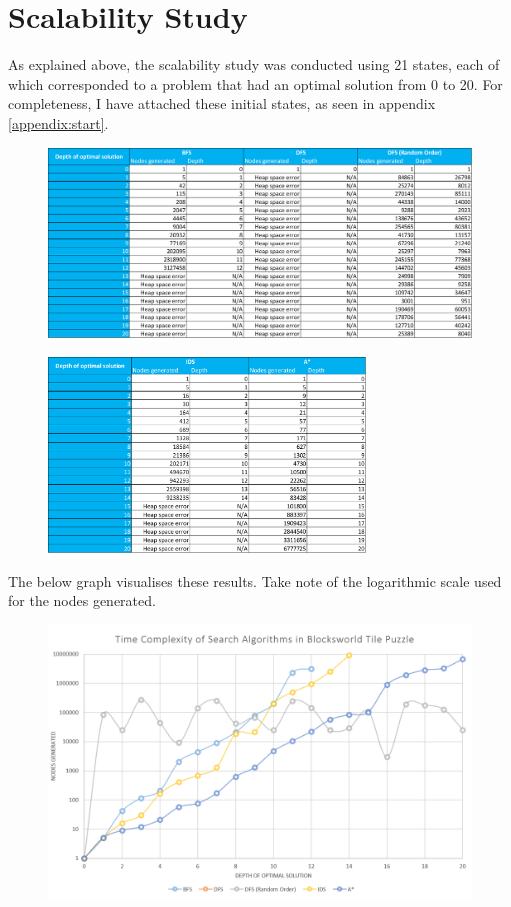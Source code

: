 \documentclass{article}
\begin{document}
	\newpage
	\section{Scalability Study}
	As explained above, the scalability study was conducted using 21 states, each of which corresponded to a problem that had an optimal solution from 0 to 20. For completeness, I have attached these initial states, as seen in appendix \ref{appendix:start}.
	\begin{figure}[h]	
		\centering
		\includegraphics[width=\textwidth,keepaspectratio]{Results-1.png}
	\end{figure}
	\begin{figure}[h]	
		\centering
		\includegraphics[width=0.75\textwidth,keepaspectratio]{Results-2.png}
	\end{figure}

	\newpage
	The below graph visualises these results. Take note of the logarithmic scale used for the nodes generated.
	\begin{figure}[h]	
		\centering
		\includegraphics[height=0.5\textheight,keepaspectratio]{Results-Plot.png}
	\end{figure}
\end{document}
